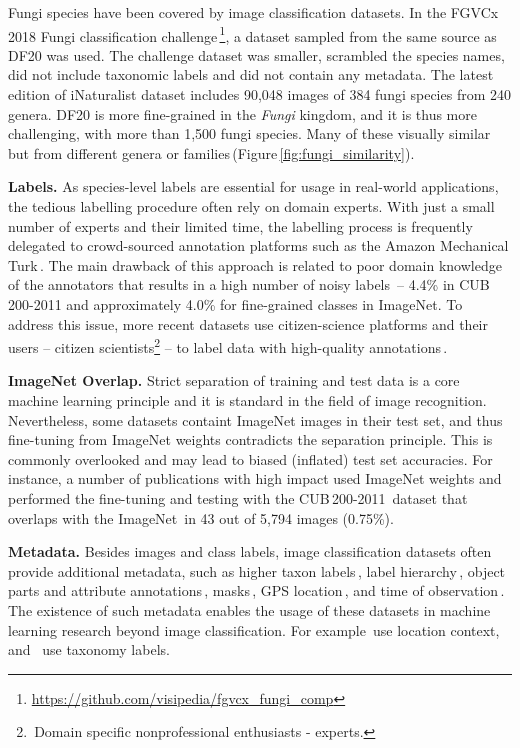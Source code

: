 \documentclass[10pt,twocolumn,letterpaper]{article}
\begin{document}
Fungi species have been covered by image classification datasets.
In the FGVCx 2018 Fungi classification challenge\,\footnote{\url{https://github.com/visipedia/fgvcx_fungi_comp}}, a dataset sampled from the same source as DF20 was used.
The challenge dataset was smaller, scrambled the species names, did not include taxonomic labels and did not contain any metadata.
The latest edition of iNaturalist dataset includes 90,048 images of 384 fungi species from 240 genera.
DF20 is more fine-grained in the \textit{Fungi} kingdom, and it is thus more challenging, with more than 1,500 fungi species. Many of these visually similar but from different genera or families\,(Figure\,\ref{fig:fungi_similarity}).

\textbf{Labels.} As species-level labels are essential for usage in real-world applications, the tedious labelling procedure often rely on domain experts. With just a small number of experts and their limited time, the labelling process is frequently delegated to crowd-sourced annotation platforms such as the Amazon Mechanical Turk\,\cite{imagenet, dataset-dataset-DOGS, dataset-CUBS}. The main drawback of this approach is related to poor domain knowledge of the annotators that results in a high number of noisy labels\,\cite{nabirds_dataset} -- 4.4\% in CUB\,200-2011  and approximately 4.0\% for fine-grained classes in ImageNet. To address this issue, more recent datasets use citizen-science platforms and their users -- citizen scientists\footnote{\,Domain specific nonprofessional enthusiasts - experts.} -- to label data with high-quality annotations\,\cite{nabirds_dataset, inaturalist2017}.

\textbf{ImageNet Overlap.} Strict separation of training and test data is a core machine learning principle and it is standard in the field of image recognition.
Nevertheless, some datasets containt ImageNet images in their test set, and thus
fine-tuning from ImageNet weights contradicts the separation principle. This is commonly overlooked and may lead to biased (inflated) test set accuracies.
For instance, a number of publications with high impact used ImageNet weights and performed the fine-tuning and testing with the CUB\,200-2011\,\cite{dataset-CUBS} dataset that overlaps with the ImageNet\,\cite{ft_imagenet_7, ft_imagenet_2, ft_imagenet_4, ft_imagenet_3, ft_imagenet_5, ft_imagenet_6, ft_imagenet_8, ft_imagenet_9, ft_imagenet_1} in 43 out of 5,794 images (0.75\%).

\textbf{Metadata.} Besides images and class labels, image classification datasets often provide additional metadata, such as higher taxon labels\,\cite{plantclef2015, inaturalist2017}, label hierarchy\,\cite{imagenet, vegfru_dataset, aircafts}, object parts and attribute annotations\,\cite{plantclef2015, nabirds_dataset, dataset-CUBS}, masks\,\cite{dataset-CUBS}, GPS location\,\cite{plantclef2015}, and time of observation\,\cite{plantclef2015}. The existence of such metadata enables the usage of these datasets in machine learning research beyond image classification. For example\,\cite{bargoti2016image, ellen2019improving, Aodha_2019_ICCV} use location context, and \,\cite{goo2016taxonomy} use taxonomy labels.
\end{document}
